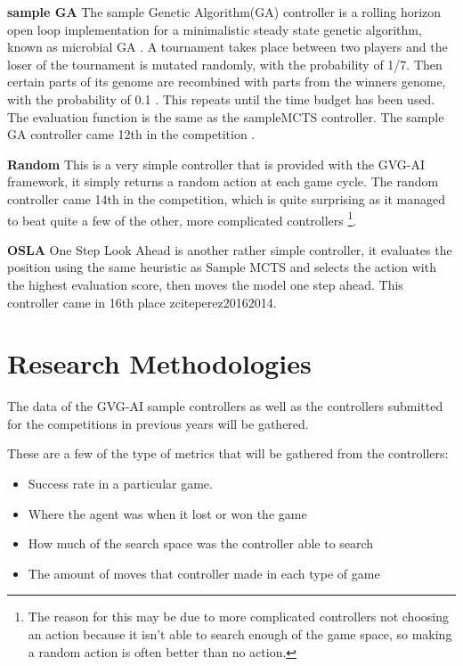 \documentclass[journal]{IEEEtran}
\begin{document}
		\textbf{sample GA} \label{sssec:sampleGA}
			The sample Genetic Algorithm(GA) controller is a rolling horizon open loop implementation for a minimalistic steady state genetic algorithm, known as microbial GA \cite{harvey2009microbial, perez20162014}.
			A tournament takes place between two players and the loser of the tournament is mutated randomly, with the probability of 1/7. Then certain parts of its genome are recombined with parts from the winners genome, with the probability of 0.1 \cite{perez20162014}. 
			This repeats until the time budget has been used. The evaluation function is the same as the sampleMCTS controller. 
			The sample GA controller came 12th in the competition \cite{perez20162014}.
			

		\textbf{Random}
			This is a very simple controller that is provided with the GVG-AI framework, it simply returns a random action at each game cycle.
			The random controller came 14th in the competition, which is quite surprising as it managed to beat quite a few of the other, more complicated controllers \footnote{The reason for this may be due to more complicated controllers not choosing an action because it isn't able to search enough of the game space, so making a random action is often better than no action.}.

		\textbf{OSLA}
			One Step Look Ahead is another rather simple controller, it evaluates the position using the same heuristic as Sample MCTS and selects the action with the highest evaluation score, then moves the model one step ahead. This controller came in 16th place zcite{perez20162014}.

	
		
	
\section{Research Methodologies}	
	The data of the GVG-AI sample controllers as well as the controllers submitted for the competitions in previous years will be gathered. 

	These are a few of the type of metrics that will be gathered from the controllers:
	\begin{itemize}
		\item Success rate in a particular game.
		\item Where the agent was when it lost or won the game
		\item How much of the search space was the controller able to search
		\item The amount of moves that controller made in each type of game
	\end{itemize}
\end{document}
